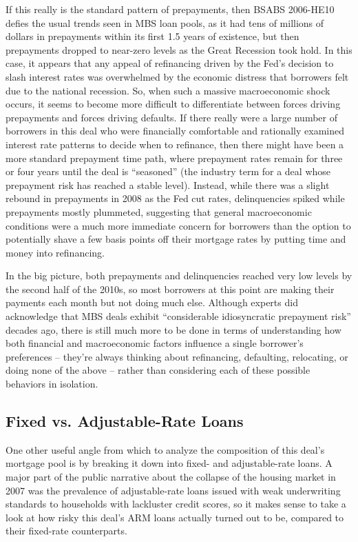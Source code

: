 \documentclass[12pt]{article}
\begin{document}
If this really is the standard pattern of prepayments, then BSABS 2006-HE10 defies the usual trends seen in MBS loan pools, as it had tens of millions of dollars in prepayments within its first 1.5 years of existence, but then prepayments dropped to near-zero levels as the Great Recession took hold.  In this case, it appears that any appeal of refinancing driven by the Fed's decision to slash interest rates was overwhelmed by the economic distress that borrowers felt due to the national recession. So, when such a massive macroeconomic shock occurs, it seems to become more difficult to differentiate between forces driving prepayments and forces driving defaults. If there really were a large number of borrowers in this deal who were financially comfortable and rationally examined interest rate patterns to decide when to refinance, then there might have been a more standard prepayment time path, where prepayment rates remain for three or four years until the deal is “seasoned” (the industry term for a deal whose prepayment risk has reached a stable level). Instead, while there was a slight rebound in prepayments in 2008 as the Fed cut rates, delinquencies spiked while prepayments mostly plummeted, suggesting that general macroeconomic conditions were a much more immediate concern for borrowers than the option to potentially shave a few basis points off their mortgage rates by putting time and money into refinancing.

In the big picture, both prepayments and delinquencies reached very low levels by the second half of the 2010s, so most borrowers at this point are making their payments each month but not doing much else. Although experts did acknowledge that MBS deals exhibit “considerable idiosyncratic prepayment risk” \parencite{becketti89} decades ago, there is still much more to be done in terms of understanding how both financial and macroeconomic factors influence a single borrower’s preferences – they’re always thinking about refinancing, defaulting, relocating, or doing none of the above – rather than considering each of these possible behaviors in isolation.

\subsection*{Fixed vs. Adjustable-Rate Loans}

One other useful angle from which to analyze the composition of this deal’s mortgage pool is by breaking it down into fixed- and adjustable-rate loans. A major part of the public narrative about the collapse of the housing market in 2007 was the prevalence of adjustable-rate loans issued with weak underwriting standards to households with lackluster credit scores, so it makes sense to take a look at how risky this deal’s ARM loans actually turned out to be, compared to their fixed-rate counterparts.
\end{document}

